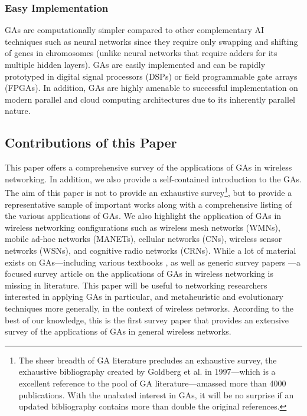 \documentclass[journal]{IEEEtran}
\begin{document}
\vspace{2mm}
\subsubsection{Easy Implementation} 

GAs are computationally simpler compared to other complementary AI techniques such as neural networks since they require only swapping and shifting of genes in chromosomes (unlike neural networks that require adders for its multiple hidden layers). GAs are easily implemented and can be rapidly prototyped in digital signal processors (DSPs) or field programmable gate arrays (FPGAs). In addition, GAs are highly amenable to successful implementation on modern parallel and cloud computing architectures due to its inherently parallel nature. 

\subsection{Contributions of this Paper}

This paper offers a comprehensive survey of the applications of GAs in wireless networking. In addition, we also provide a self-contained introduction to the GAs. The aim of this paper is not to provide an exhaustive survey\footnote{The sheer breadth of GA literature precludes an exhaustive survey, the exhaustive bibliography created by Goldberg et al. in 1997---which is a excellent reference to the pool of GA literature---amassed more than 4000 publications. With the unabated interest in GAs, it will be no surprise if an updated bibliography contains more than double the original references.}, but to provide a  representative sample of important works along with a comprehensive listing of the various applications of GAs. We also highlight the application of GAs in wireless networking configurations such as wireless mesh networks (WMNs), mobile ad-hoc networks (MANETs), cellular networks (CNs), wireless sensor networks (WSNs), and cognitive radio networks (CRNs). While a lot of material exists on GAs---including various textbooks \cite{goldberg1988genetic} \cite{davis1991handbook} \cite{pedrycz2010computational}, as well as generic survey papers \cite{srinivas1994genetic} \cite{man1996genetic}---a focused survey article on the applications of GAs in wireless networking is missing in literature. This paper will be useful to networking researchers interested in applying GAs in particular, and metaheuristic and evolutionary techniques more generally, in the context of wireless networks. According to the best of our knowledge, this is the first survey paper that provides an extensive survey of the applications of GAs in general wireless networks. 
\end{document}
